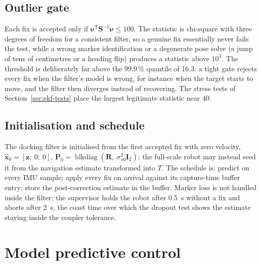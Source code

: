 \documentclass[11pt,a4paper]{article}
\newcommand{\vect}[1]{\bm{#1}}
\newcommand{\mat}[1]{\bm{#1}}
\newcommand{\T}{^{\mathsf{T}}}
\DeclareMathOperator{\blkdiag}{blkdiag}
\newcommand{\hx}{\hat{\vect x}}
\begin{document}
\subsection{Outlier gate}
Each fix is accepted only if $\vect\nu\T\mat S^{-1}\vect\nu \le 100$. The statistic is chi-square with three degrees of freedom for a consistent filter, so a genuine fix essentially never fails the test, while a wrong marker identification or a degenerate pose solve (a jump of tens of centimetres or a heading flip) produces a statistic above $10^3$. The threshold is deliberately far above the 99.9\,\% quantile of 16.3: a tight gate rejects every fix when the filter's model is wrong, for instance when the target starts to move, and the filter then diverges instead of recovering. The stress tests of Section~\ref{sec:ekf-tests} place the largest legitimate statistic near 40.

\subsection{Initialisation and schedule}
The docking filter is initialised from the first accepted fix with zero velocity, $\hx_0 = [\vect z;\ 0;\ 0]$, $\mat P_0 = \blkdiag(\mat R,\ \sigma_{v0}^2\mat I_2)$; the full-scale robot may instead seed it from the navigation estimate transformed into $T$. The schedule is: predict on every IMU sample; apply every fix on arrival against its capture-time buffer entry; store the post-correction estimate in the buffer. Marker loss is not handled inside the filter; the supervisor holds the robot after 0.5~s without a fix and aborts after 2~s, the coast time over which the dropout test shows the estimate staying inside the coupler tolerance.

\section{Model predictive control}
\label{sec:mpc}
\end{document}
